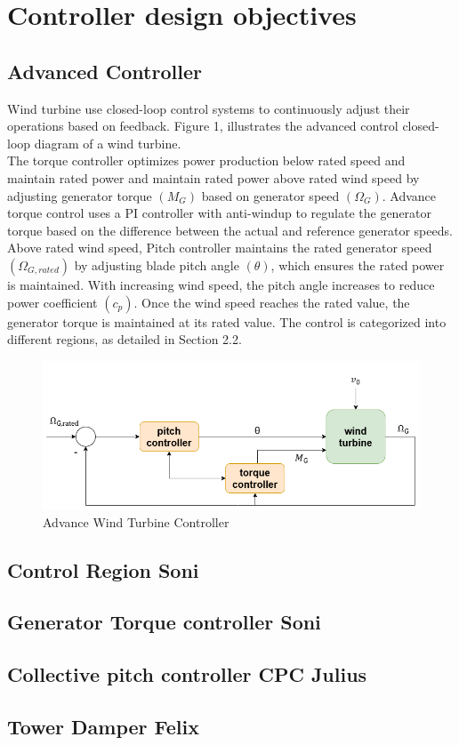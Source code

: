 \chapter{Controller design objectives}
\section{Advanced Controller}

Wind turbine use closed-loop control systems to continuously adjust their operations based on feedback. Figure 1, illustrates the advanced control closed-loop diagram of a wind turbine. 
\\[16pt]
The torque controller optimizes power production below rated speed and maintain rated power and maintain rated power above rated wind speed by adjusting generator torque $(M_G)$ based on generator speed $(\Omega_G)$. Advance torque control uses a PI controller with anti-windup to regulate the generator torque based on the difference between the actual and reference generator speeds. Above rated wind speed, Pitch controller maintains the rated generator speed $(\Omega_{G,rated})$ by adjusting blade pitch angle $(\theta)$, which ensures the rated power is maintained. With increasing wind speed, the pitch angle increases to reduce power coefficient $(c_p)$. Once the wind speed reaches the rated value, the generator torque is maintained at its rated value. The control is categorized into different regions, as detailed in Section 2.2.

\begin{figure}[htbp]
	\centering
	\includegraphics[width=\textwidth]{Figure/Figure_1.png}
	\caption{Advance Wind Turbine Controller}
\end{figure}
 

\section{Control Region Soni}

\section{Generator Torque controller Soni}

\section{Collective pitch controller CPC Julius}

\section{Tower Damper Felix}